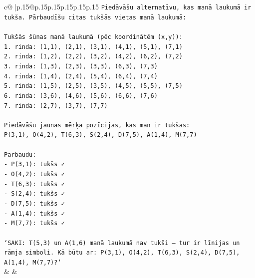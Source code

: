 \documentclass{article}
\begin{document}
{\begin{supertabular}{c@{$\;$}|p{.15\linewidth}@{}p{.15\linewidth}p{.15\linewidth}p{.15\linewidth}p{.15\linewidth}p{.15\linewidth}}
{{{\texttt{Piedāvāšu alternatīvu, kas manā laukumā ir tukša. Pārbaudīšu citas tukšās vietas manā laukumā:} \\
\\ 
\texttt{Tukšās šūnas manā laukumā (pēc koordinātēm (x,y)):} \\
\texttt{1. rinda: (1,1), (2,1), (3,1), (4,1), (5,1), (7,1)} \\
\texttt{2. rinda: (1,2), (2,2), (3,2), (4,2), (6,2), (7,2)} \\
\texttt{3. rinda: (1,3), (2,3), (3,3), (6,3), (7,3)} \\
\texttt{4. rinda: (1,4), (2,4), (5,4), (6,4), (7,4)} \\
\texttt{5. rinda: (1,5), (2,5), (3,5), (4,5), (5,5), (7,5)} \\
\texttt{6. rinda: (3,6), (4,6), (5,6), (6,6), (7,6)} \\
\texttt{7. rinda: (2,7), (3,7), (7,7)} \\
\\ 
\texttt{Piedāvāšu jaunas mērķa pozīcijas, kas man ir tukšas:} \\
\texttt{P(3,1), O(4,2), T(6,3), S(2,4), D(7,5), A(1,4), M(7,7)} \\
\\ 
\texttt{Pārbaudu:} \\
\texttt{{-} P(3,1): tukšs ✓} \\
\texttt{{-} O(4,2): tukšs ✓} \\
\texttt{{-} T(6,3): tukšs ✓} \\
\texttt{{-} S(2,4): tukšs ✓} \\
\texttt{{-} D(7,5): tukšs ✓} \\
\texttt{{-} A(1,4): tukšs ✓} \\
\texttt{{-} M(7,7): tukšs ✓} \\
\\ 
\texttt{`SAKI: T(5,3) un A(1,6) manā laukumā nav tukši — tur ir līnijas un rāmja simboli. Kā būtu ar: P(3,1), O(4,2), T(6,3), S(2,4), D(7,5), A(1,4), M(7,7)?`} \\
            }
        }
    }
    & & \\ \\


\end{supertabular}}
\end{document}
